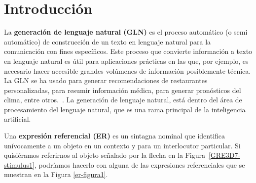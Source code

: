 \chapter{Introducci\'on}
\label{sec:intro}

La {\bf generaci\'on de lenguaje natural (GLN)} es el proceso autom\'atico (o semi autom\'atico) de construcci\'on de un texto en lenguaje natural para la comunicaci\'on con fines espec\'ificos. Este proceso que convierte informaci\'on a texto en lenguaje natural es \'util para aplicaciones pr\'acticas en las que, por ejemplo, es necesario hacer accesible grandes vol\'umenes de informaci\'on posiblemente t\'ecnica. La GLN se ha usado para generar recomendaciones de restaurantes personalizadas, para resumir informaci\'on m\'edica, para generar pron\'osticos del clima, entre otros.~\cite{dale2000}. La generaci\'on de lenguaje natural, est\'a dentro del \'area de procesamiento del lenguaje natural, que es una rama principal de la inteligencia artificial.

Una {\bf expresi\'on referencial (ER)} es un sintagna nominal que identifica un\'ivocamente a un objeto en un contexto y para un interlocutor particular. Si quisi\'eramos referirnos al objeto se\~nalado por la flecha en la Figura~\ref{GRE3D7-stimulus1}, podr\'iamos hacerlo con alguna de las expresiones referenciales que se muestran en la Figura \ref{er-figura1}.

